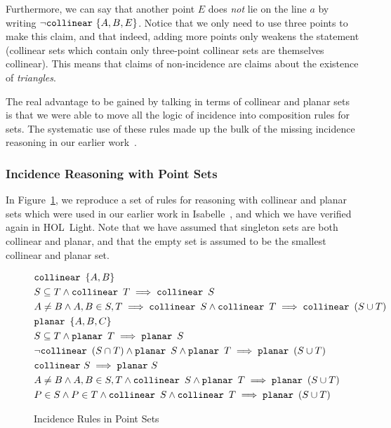 Furthermore, we can say that another point $E$ does \emph{not} lie on the line $a$ by writing $\neg \texttt{collinear}\ \{A, B, E\}$. Notice that we only need to use three points to make this claim, and that indeed, adding more points only weakens the statement (collinear sets which contain only three-point collinear sets are themselves collinear). This means that claims of non-incidence are claims about the existence of \emph{triangles}.

The real advantage to be gained by talking in terms of collinear and planar sets is that we were able to move all the logic of incidence into composition rules for sets. The systematic use of these rules made up the bulk of the missing incidence reasoning in our earlier work~\cite{ScottMScThesis}.

\subsubsection{Incidence Reasoning with Point Sets}\label{sec:PointSets}
In Figure~\ref{fig:PointSets}, we reproduce a set of rules for reasoning with collinear and planar sets which were used in our earlier work in Isabelle~\cite{ScottMScThesis}, and which we have verified again in HOL~Light. Note that we have assumed that singleton sets are both collinear and planar, and that the empty set is assumed to be the smallest collinear and planar set. 

\begin{figure}
\begin{align}
&\texttt{collinear}\ \, \{A,B\} \label{rule:colltwo}\\
&S \subseteq T \wedge \texttt{collinear}\ \, T \implies \texttt{collinear}\ \, S
  \label{rule:collsubset}\\
&A \neq B \wedge A,B \in S,T \implies \texttt{collinear}\ \, S \wedge \texttt{collinear}\ \, T \implies \texttt{collinear}\ \, (S \cup T) \label{rule:collunion}\\
&\texttt{planar}\ \, \{A,B,C\} \label{rule:planethree}\\
&S \subseteq T \wedge \texttt{planar}\ \, T \implies \texttt{planar}\ \, S
  \label{rule:planesubset}\\
&\neg\texttt{collinear}\ \, (S \cap T) \wedge \texttt{planar}\ \, S \wedge \texttt{planar}\ \, T \implies \texttt{planar}\ \, (S \cup T) \label{rule:planeunion}\\
&\texttt{collinear}\  S \implies \texttt{planar}\  S \label{rule:collplane}\\
&A \neq B \wedge A,B \in S,T \wedge \texttt{collinear}\ \, S \wedge \texttt{planar}\ \, T \implies \texttt{planar}\ \, (S \cup T) \label{rule:collplaneplane}\\
&P \in S \wedge P \in T \wedge \texttt{collinear}\ \, S \wedge \texttt{collinear}\ \, T \implies \texttt{planar}\ \, (S \cup T) \label{rule:collcollplane}
\end{align}
\caption{Incidence Rules in Point Sets}\label{fig:PointSets}
\end{figure}

